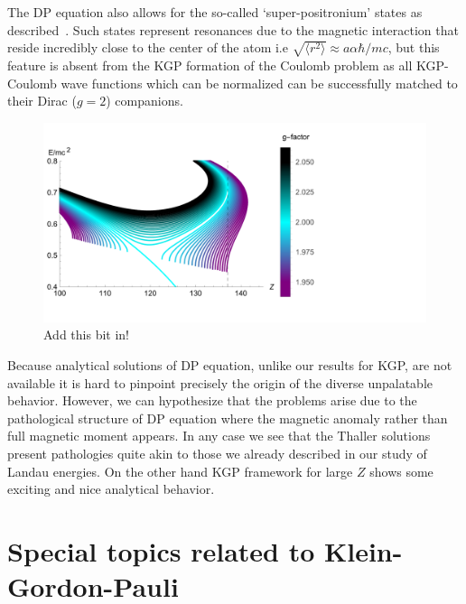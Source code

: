 The DP equation also allows for the so-called `super-positronium' states as described~\cite{Barut:1975hz,Barut:1976hs}. Such states represent resonances due to the magnetic interaction that reside incredibly close to the center of the atom i.e $\sqrt{\langle r^{2}\rangle}\approx a\alpha\hbar/mc$, but this feature is absent from the KGP formation of the Coulomb problem as all KGP-Coulomb wave functions which can be normalized can be successfully matched to their Dirac ($g\!=\!2$) companions.

\begin{figure}[h]
    \centering
    \includegraphics[clip, trim=0.0cm 0.0cm 8.0cm 0.0cm,width=0.95\linewidth]{plots/chap02moment/lanplot05.pdf}
     \caption{Add this bit in!}
    \label{fig:gspec}
\end{figure}

Because analytical solutions of DP equation, unlike our results for KGP, are not available it is hard to pinpoint precisely the origin of the diverse unpalatable behavior. However, we can hypothesize that the problems arise due to the pathological structure of DP equation where the magnetic anomaly rather than full magnetic moment appears. In any case we see that the Thaller solutions present pathologies quite akin to those we already described in our study of Landau energies. On the other hand KGP framework for large $Z$ shows some exciting and nice analytical behavior.

\section{Special topics related to Klein-Gordon-Pauli}
\label{sec:kgptopics}
